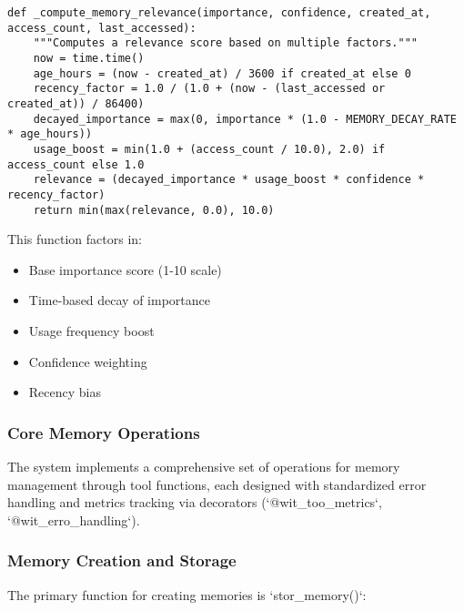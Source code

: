 \documentclass[12pt,a4paper]{article}
\begin{document}
\begin{pageablecode}
\begin{verbatim}
def _compute_memory_relevance(importance, confidence, created_at, access_count, last_accessed):
    """Computes a relevance score based on multiple factors."""
    now = time.time()
    age_hours = (now - created_at) / 3600 if created_at else 0
    recency_factor = 1.0 / (1.0 + (now - (last_accessed or created_at)) / 86400)
    decayed_importance = max(0, importance * (1.0 - MEMORY_DECAY_RATE * age_hours))
    usage_boost = min(1.0 + (access_count / 10.0), 2.0) if access_count else 1.0
    relevance = (decayed_importance * usage_boost * confidence * recency_factor)
    return min(max(relevance, 0.0), 10.0)
\end{verbatim}
\end{pageablecode}

This function factors in:
\begin{itemize}
    \item Base importance score (1-10 scale)
    \item Time-based decay of importance
    \item Usage frequency boost
    \item Confidence weighting
    \item Recency bias
\end{itemize}

\subsubsection*{Core Memory Operations}

The system implements a comprehensive set of operations for memory management through tool functions, each designed with standardized error handling and metrics tracking via decorators (`@wit\1\_too\1\_metrics`, `@wit\1\_erro\1\_handling`).

\subsubsection*{Memory Creation and Storage}

The primary function for creating memories is `stor\1\_memory()`:
\end{document}
